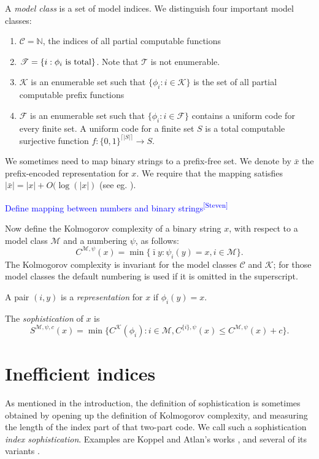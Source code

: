 \documentclass{style/llncs}
\newcommand{\M}{\mathscr M}
\newcommand{\C}{\mathscr C}
\newcommand{\T}{\mathscr T}
\newcommand{\F}{\mathscr F}
\newcommand{\K}{\mathscr K}
\newcommand{\N}{\mathbb N}
\newcommand{\tn}[1]{\textnormal{#1}}
\newcommand{\sdr}[1]{\textcolor{blue}{\small #1\textsuperscript{[Steven]} }}
\begin{document}
A \emph{model class} is a set of model indices. We distinguish four important model classes: 
\begin{enumerate}
\item $\C=\N$, the indices of all partial computable functions
\item $\T=\{i:\tn{$\phi_i$ is total}\}$. Note that $\T$ is not enumerable.
\item $\K$ is an enumerable set such that $\{\phi_i:i\in\K\}$ is the set of all partial computable prefix functions
\item $\F$ is an enumerable set such that $\{\phi_i:i\in\F\}$ contains a uniform code for every finite set. A uniform code for a finite set $S$ is a total computable surjective function $f:\{0,1\}^{\lceil|S|\rceil}\to S$.
\end{enumerate}

We sometimes need to map binary strings to a prefix-free set. We denote by $\bar x$ the prefix-encoded representation for $x$. We require that the mapping satisfies $|\bar{x}| = |x|+O(\log(|x|)$ (see eg. \cite[Section~1.4]{li1993introduction}).

\sdr{Define mapping between numbers and binary strings}

Now define the Kolmogorov complexity of a binary string $x$, with respect to a model class $\M$ and a numbering $\psi$, as follows:
\[
C^{\M,\psi}(x)=\min\{\bar\imath y:\psi_i(y)=x,i\in\M\}.
\]
The Kolmogorov complexity is invariant for the model classes $\C$ and $\K$; for those model classes the default numbering is used if it is omitted in the superscript.

A pair $(i,y)$ is a \emph{representation} for $x$ if $\phi_i(y)=x$.

The \emph{sophistication} of $x$ is 
\begin{equation}\label{eq:soph}
S^{\M,\psi,c}(x)=\min\{C^\K(\phi_i):i\in\M,C^{\{i\},\psi}(x)\le C^{\M,\psi}(x)+c\}.
\end{equation}

\section{Inefficient indices}
\label{section:indices}
As mentioned in the introduction, the definition of sophistication is sometimes obtained by opening up the definition of Kolmogorov complexity, and measuring the length of the index part of that two-part code. We call such a sophistication \emph{index sophistication}. Examples are Koppel and Atlan's works \cite{koppelSoph1988,koppel1991almost},  and several of its variants \cite{antunes2009sophistication,antunes2013sophistication}. 
\end{document}
